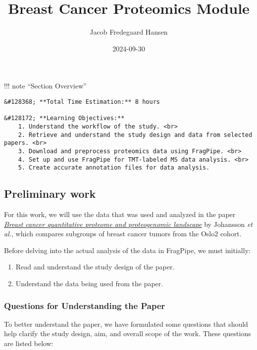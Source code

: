 \documentclass[
  letterpaper,
  DIV=11,
  numbers=noendperiod]{scrartcl}
\title{Breast Cancer Proteomics Module}
\author{Jacob Fredegaard Hansen}
\date{2024-09-30}
\providecommand{\tightlist}{%
  \setlength{\itemsep}{0pt}\setlength{\parskip}{0pt}}\usepackage{longtable,booktabs,array}
\renewcommand*\contentsname{Table of contents}
\newcommand\contentsname{Table of contents}
\begin{document}
\maketitle

\renewcommand*\contentsname{Table of Contents}
{
\hypersetup{linkcolor=}
\setcounter{tocdepth}{3}
\tableofcontents
}
!!! note ``Section Overview''

\begin{verbatim}
&#128368; **Total Time Estimation:** 8 hours

&#128172; **Learning Objectives:**    
    1. Understand the workflow of the study. <br>
    2. Retrieve and understand the study design and data from selected papers. <br>
    3. Download and preprocess proteomics data using FragPipe. <br>
    4. Set up and use FragPipe for TMT-labeled MS data analysis. <br>
    5. Create accurate annotation files for data analysis.
\end{verbatim}

\subsection{Preliminary work}\label{preliminary-work}

For this work, we will use the data that was used and analyzed in the
paper
\emph{\href{https://www-nature-com.proxy1-bib.sdu.dk/articles/s41467-019-09018-y}{Breast
cancer quantitative proteome and proteogenomic landscape}} by Johansson
\emph{et al.}, which compares subgroups of breast cancer tumors from the
Oslo2 cohort.

Before delving into the actual analysis of the data in FragPipe, we must
initially:

\begin{enumerate}
\def\labelenumi{\arabic{enumi}.}
\tightlist
\item
  Read and understand the study design of the paper.
\item
  Understand the data being used from the paper.
\end{enumerate}

\subsubsection{Questions for Understanding the
Paper}\label{questions-for-understanding-the-paper}

To better understand the paper, we have formulated some questions that
should help clarify the study design, aim, and overall scope of the
work. These questions are listed below:
\end{document}
